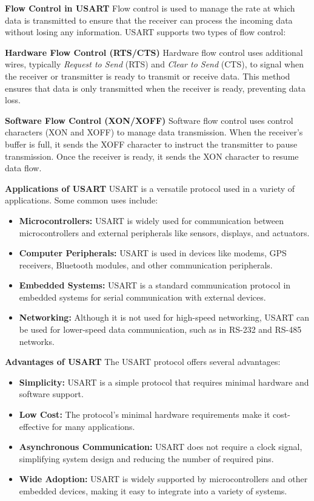 \documentclass{article}
\numberwithin{equation}{section}
\numberwithin{figure}{section}
\numberwithin{table}{section}
\begin{document}
\textbf{Flow Control in USART}
Flow control is used to manage the rate at which data is transmitted to ensure that the receiver can process the incoming data without losing any information. USART supports two types of flow control:

\textbf{Hardware Flow Control (RTS/CTS)}
Hardware flow control uses additional wires, typically \textit{Request to Send} (RTS) and \textit{Clear to Send} (CTS), to signal when the receiver or transmitter is ready to transmit or receive data. This method ensures that data is only transmitted when the receiver is ready, preventing data loss.

\textbf{Software Flow Control (XON/XOFF)}
Software flow control uses control characters (XON and XOFF) to manage data transmission. When the receiver's buffer is full, it sends the XOFF character to instruct the transmitter to pause transmission. Once the receiver is ready, it sends the XON character to resume data flow.

\textbf{Applications of USART}
USART is a versatile protocol used in a variety of applications. Some common uses include:

\begin{itemize}
    \item \textbf{Microcontrollers:} USART is widely used for communication between microcontrollers and external peripherals like sensors, displays, and actuators.
    \item \textbf{Computer Peripherals:} USART is used in devices like modems, GPS receivers, Bluetooth modules, and other communication peripherals.
    \item \textbf{Embedded Systems:} USART is a standard communication protocol in embedded systems for serial communication with external devices.
    \item \textbf{Networking:} Although it is not used for high-speed networking, USART can be used for lower-speed data communication, such as in RS-232 and RS-485 networks.
\end{itemize}

\textbf{Advantages of USART}
The USART protocol offers several advantages:


\begin{itemize}
    \item \textbf{Simplicity:} USART is a simple protocol that requires minimal hardware and software support.
    \item \textbf{Low Cost:} The protocol's minimal hardware requirements make it cost-effective for many applications.
    \item \textbf{Asynchronous Communication:} USART does not require a clock signal, simplifying system design and reducing the number of required pins.
    \item \textbf{Wide Adoption:} USART is widely supported by microcontrollers and other embedded devices, making it easy to integrate into a variety of systems.
\end{itemize}
\end{document}
